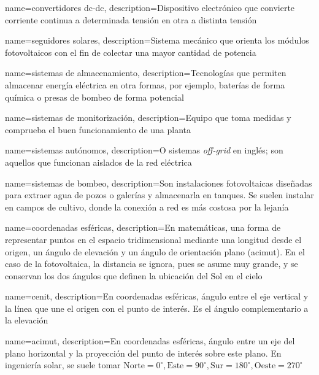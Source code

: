 {
    name={convertidores dc-dc},
    description={Dispositivo electrónico que convierte corriente continua a determinada tensión en otra a distinta tensión}
}

{
    name={seguidores solares},
    description={Sistema mecánico que orienta los módulos fotovoltaicos con el fin de colectar una mayor cantidad de potencia}
}

{
    name={sistemas de almacenamiento},
    description={Tecnologías que permiten almacenar energía eléctrica en otra formas, por ejemplo, baterías de forma química o presas de bombeo de forma potencial}
}

{
    name={sistemas de monitorización},
    description={Equipo que toma medidas y comprueba el buen funcionamiento de una planta}
}

{
    name={sistemas autónomos},
    description={O sistemas \textit{off-grid} en inglés; son aquellos que funcionan aislados de la red eléctrica}
}

{
    name={sistemas de bombeo},
    description={Son instalaciones fotovoltaicas diseñadas para extraer agua de pozos o galerías y almacenarla en tanques. Se suelen instalar en campos de cultivo, donde la conexión a red es más costosa por la lejanía}
}

{
    name={coordenadas esféricas},
    description={En matemáticas, una forma de representar puntos en el espacio tridimensional mediante una longitud desde el origen, un \gls{ángulo de elevación} y un ángulo de orientación plano (\gls{acimut}). En el caso de la fotovoltaica, la distancia se ignora, pues se asume muy grande, y se conservan los dos ángulos que definen la ubicación del Sol en el cielo}
}

{
    name={cenit},
    description={En \gls{coordenadas esféricas}, ángulo entre el eje vertical y la línea que une el origen con el punto de interés. Es el ángulo complementario a la elevación}
}

{
    name={acimut},
    description={En \gls{coordenadas esféricas}, ángulo entre un eje del plano horizontal y la proyección del punto de interés sobre este plano. En ingeniería solar, se suele tomar $\text{Norte}=0^\circ, \text{Este}=90^\circ, \text{Sur}=180^\circ, \text{Oeste}=270^\circ$}
}


